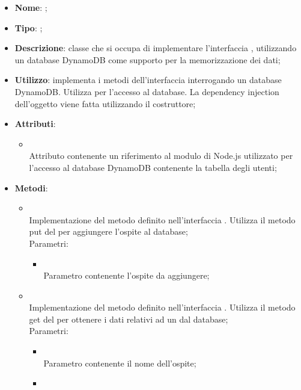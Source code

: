 \begin{itemize}
	\item \textbf{Nome}: ;
	\item \textbf{Tipo}: ;
	\item \textbf{Descrizione}: classe che si occupa di implementare l'interfaccia , utilizzando un database DynamoDB come supporto per la memorizzazione dei dati;
	\item \textbf{Utilizzo}: implementa i metodi dell'interfaccia  interrogando un database DynamoDB. Utilizza  per l'accesso al database. La dependency injection dell'oggetto  viene fatta utilizzando il costruttore;
	\item \textbf{Attributi}:
	\begin{itemize}
		\item[]  \\
		Attributo contenente un riferimento al modulo di Node.js utilizzato per l'accesso al database DynamoDB contenente la tabella degli utenti;
	\end{itemize}
	\item \textbf{Metodi}:
	\begin{itemize}
		\item[]  \\
		Implementazione del metodo definito nell'interfaccia . Utilizza il metodo put del  per aggiungere l'ospite al database;\\
		Parametri:
		\begin{itemize}
			\item {} \\
			Parametro contenente l'ospite da aggiungere;
		\end{itemize}
		\item[]  \\
		Implementazione del metodo definito nell'interfaccia . Utilizza il metodo get del  per ottenere i dati relativi ad un  dal database;\\
		Parametri:
		\begin{itemize}
			\item {} \\
			Parametro contenente il nome dell'ospite;
			\item {} \\

\end{itemize}
\end{itemize}
\end{itemize}
